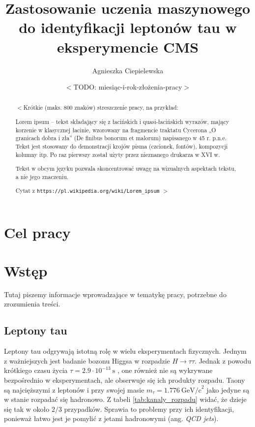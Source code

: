 \documentclass{pracalicmgr}
\author{Agnieszka Ciepielewska}
\title{Zastosowanie uczenia maszynowego do identyfikacji leptonów tau w eksperymencie CMS}
\date{$<$TODO: miesiąc-i-rok-złożenia-pracy$>$}
\begin{document}
    \maketitle
    \let\cleardoublepage\clearpage
    
    \begin{abstract}
$<$Krótkie (maks. 800 znaków) streszczenie pracy, na przykład:

Lorem ipsum – tekst składający się z łacińskich i quasi-łacińskich wyrazów, mający korzenie w klasycznej łacinie, wzorowany na fragmencie traktatu Cycerona „O granicach dobra i zła” (De finibus bonorum et malorum) napisanego w 45 r. p.n.e. Tekst jest stosowany do demonstracji krojów pisma (czcionek, fontów), kompozycji kolumny itp. Po raz pierwszy został użyty przez nieznanego drukarza w XVI w.

Tekst w obcym języku pozwala skoncentrować uwagę na wizualnych aspektach tekstu, a nie jego znaczeniu.

Cytat z {\tt https://pl.wikipedia.org/wiki/Lorem\_ipsum}
$>$

    \end{abstract}

    \tableofcontents
    
    \chapter*{Cel pracy}
    \chapter{Wstęp}
    \label{ch:wstep}
    Tutaj piszemy informacje wprowadzające w tematykę  pracy, potrzebne do zrozumienia treści.       
    \section{Leptony tau}
    
    Leptony tau	odgrywają istotną rolę w wielu eksperymentach fizycznych. Jednym z ważniejszych jest badanie bozonu Higgsa w rozpadzie $H \rightarrow \tau\tau$. Jednak z powodu krótkiego czasu życia $\tau = 2.9 \cdot 10^{-13}~\mathrm{s}$ \cite{particle_physics}, one również nie są wykrywane bezpośrednio w eksperymentach, ale obserwuje się ich produkty rozpadu. Taony są najcięższymi z leptonów i przy swojej masie $m_\tau = 1.776 ~\mathrm{GeV/c}^2$ \cite{particle_physics} jako jedyne są w stanie rozpadać się hadronowo. Z tabeli \ref{tab:kanaly_rozpadu} widać, że dzieje się tak w około $2/3$ przypadków. Sprawia to problemy przy ich identyfikacji, ponieważ łatwo jest je pomylić z jetami hadronowymi (ang. \textit{QCD jets}).
    
\end{document}
